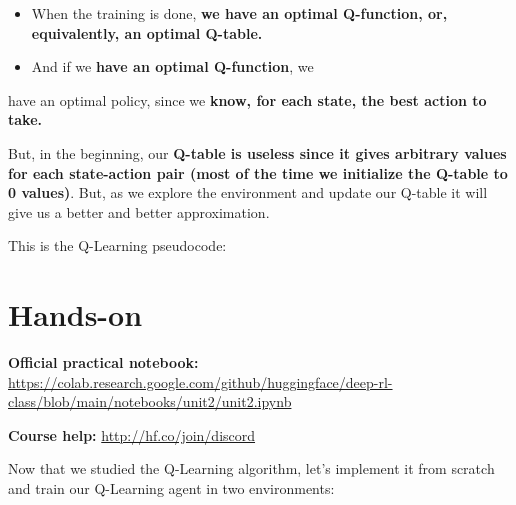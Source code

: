 \documentclass[11pt,a4paper]{article}
\begin{document}

\begin{itemize}
\item
  When the training is done, \textbf{we have an optimal Q-function, or, equivalently, an optimal Q-table.}
\item
  And if we \textbf{have an optimal Q-function}, we
\end{itemize}

have an optimal policy, since we \textbf{know, for each state, the best action to take.}


But, in the beginning, our \textbf{Q-table is useless since it gives arbitrary values for each state-action pair (most of the time we initialize the Q-table to 0 values)}. But, as we explore the environment and update our Q-table it will give us a better and better approximation.


This is the Q-Learning pseudocode:


\section{Hands-on}\label{hands-on}

\textbf{Official practical notebook:} \url{https://colab.research.google.com/github/huggingface/deep-rl-class/blob/main/notebooks/unit2/unit2.ipynb}

\textbf{Course help:} \url{http://hf.co/join/discord}

Now that we studied the Q-Learning algorithm, let's implement it from scratch and train our Q-Learning agent in two environments:
\end{document}
